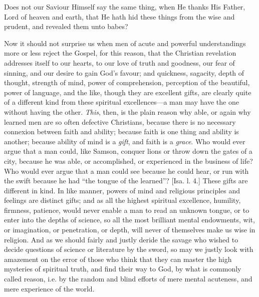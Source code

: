 Does not our Saviour Himself say the same thing, when He thanks His
Father, Lord of heaven and earth, that He hath hid these things from
the wise and prudent, and revealed them unto babes?

Now it should not surprise us when men of acute and powerful
understandings more or less reject the Gospel, for this reason, that
the Christian revelation addresses itself to our hearts, to our love
of truth and goodness, our fear of sinning, and our desire to gain
God's favour; and quickness, sagacity, depth of thought, strength of
mind, power of comprehension, perception of the beautiful, power of
language, and the like, though they are excellent gifts, are clearly
quite of a different kind from these spiritual excellences—a man may
have the one without having the other. \emph{This}, then, is the plain
reason why able, or again why learned men are so often defective
Christians, because there is no necessary connexion between faith and
ability; because faith is one thing and ability is another; because
ability of mind is a \emph{gift}, and faith is a \emph{grace}. Who
would ever argue that a man could, like Samson, conquer lions or throw
down the gates of a city, because he was able, or accomplished, or
experienced in the business of life? Who would ever argue that a man
could see because he could hear, or run with the swift because he had
``the tongue of the learned''? [Isa. l. 4.] These gifts are
different in kind. In like manner, powers of mind and religious principles and feelings are distinct gifts; and as all the highest
spiritual excellence, humility, firmness, patience, would never enable
a man to read an unknown tongue, or to enter into the depths of
science, so all the most brilliant mental endowments, wit, or
imagination, or penetration, or depth, will never of themselves make
us wise in religion. And as we should fairly and justly deride the
savage who wished to decide questions of science or literature by the
sword, so may we justly look with amazement on the error of those who
think that they can master the high mysteries of spiritual truth, and
find their way to God, by what is commonly called reason, i.e. by the
random and blind efforts of mere mental acuteness, and mere experience
of the world.

